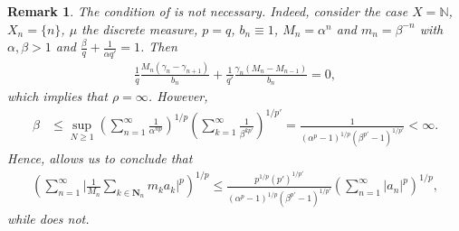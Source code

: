 \documentclass[oneside,10pt]{article}          %
\newtheorem{rem}{Remark}
\numberwithin{equation}{section}
\begin{document}



\begin{rem}\label{rem - counter-example}
    The condition of  is not necessary. Indeed, consider the case $X=\mathbb{N}$, $X_n=\{n\}$, $\mu$ the discrete measure, $p=q$, $b_n\equiv 1$, $M_n=\alpha^{n}$ and $m_n=\beta^{-n}$ with $\alpha,\beta>1$ and $\frac{\beta}{q}+\frac{1}{\alpha q'}=1$. Then
    \begin{align*}
        \frac{1}{q}\frac{M_n(\gamma_n-\gamma_{n+1})}{b_n}
    +\frac{1}{q'}\frac{\gamma_n(M_n-M_{n-1})}{b_n} = 0,
    \end{align*}
    which implies that $\rho=\infty$. However, 
    \begin{align*}
        \beta &\leq \sup_{N\geq 1} \left( \sum_{n=1}^{\infty}\frac{1}{\alpha^{np}} \right)^{\!\!1/p}\!\! \left(\sum_{k=1}^{\infty} \frac{1}{\beta^{kp'}}
    \right)^{\!\!1/p'}\! = \frac{1}{(\alpha^p-1)^{1/p}(\beta^{p'}-1)^{1/p'}} < \infty.
    \end{align*}
    Hence,  allows us to conclude that 
    \begin{align*}
        \left(\sum_{n=1}^{\infty} \Bigg|\frac{1}{M_n}\sum_{k \in \mathbf{N}_n} m_k a_k \Bigg|^p\right)^{\!\!1/p}
        \!\!\leq  \frac{p^{1/p}(p')^{1/p'}}{(\alpha^p-1)^{1/p}(\beta^{p'}-1)^{1/p'}}\!\left(\sum_{n=1}^\infty|a_n|^p\right)^{\!\!1/p}\!,
    \end{align*}
    while  does not.
\end{rem}
\end{document}
